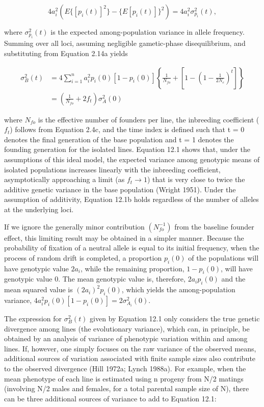 \documentclass{article}
\begin{document}
\begin{equation}
4a_{i}^{2}\left(E\{[p_{i}(t)]^{2}\}-\{E[p_{i}(t)]\}^{2}\right)=4a_{i}^{2}\sigma_{p_{i}}^{2}(t),
\end{equation}

where  $ \sigma_{p_i}^2(t) $ is the expected among-population variance in allele frequency. Summing over all loci, assuming negligible gametic-phase disequilibrium, and substituting from Equation 2.14a yields

\begin{equation}
\begin{aligned}\sigma_{B}^{2}(t)&=4\sum_{i=1}^{n}a_{i}^{2}p_{i}(0)[1-p_{i}(0)]\left\{\frac{1}{N_{f o}}+\left[1-\left(1-\frac{1}{2N_{e}}\right)^{t}\right]\right\}\\&=\left(\frac{1}{N_{f o}}+2f_{t}\right)\sigma_{A}^{2}(0)\end{aligned}
\tag{12.1a}
\label{eq:12_1a}
\end{equation}

where  $ N_{fo} $ is the effective number of founders per line, the inbreeding coefficient ( $ f_t $) follows from Equation 2.4c, and the time index is defined such that t = 0 denotes the final generation of the base population and t = 1 denotes the founding generation for the isolated lines. Equation 12.1 shows that, under the assumptions of this ideal model, the expected variance among genotypic means of isolated populations increases linearly with the inbreeding coefficient, asymptotically approaching a limit (as  $ f_t \to 1 $) that is very close to twice the additive genetic variance in the base population (Wright 1951). Under the assumption of additivity, Equation 12.1b holds regardless of the number of alleles at the underlying loci.

If we ignore the generally minor contribution  $ (N_{fo}^{-1}) $ from the baseline founder effect, this limiting result may be obtained in a simpler manner. Because the probability of fixation of a neutral allele is equal to its initial frequency, when the process of random drift is completed, a proportion  $ p_i(0) $ of the populations will have genotypic value  $ 2a_i $, while the remaining proportion,  $ 1 - p_i(0) $, will have genotypic value 0. The mean genotypic value is, therefore,  $ 2a_i p_i(0) $ and the mean squared value is  $ (2a_i)^2 p_i(0) $, which yields the among-population variance,  $ 4a_i^2 p_i(0)[1 - p_i(0)] = 2\sigma_{A_i}^2(0) $.

The expression for  $ \sigma_B^2(t) $ given by Equation 12.1 only considers the true genetic divergence among lines (the evolutionary variance), which can, in principle, be obtained by an analysis of variance of phenotypic variation within and among lines. If, however, one simply focuses on the raw variance of the observed means, additional sources of variation associated with finite sample sizes also contribute to the observed divergence (Hill 1972a; Lynch 1988a). For example, when the mean phenotype of each line is estimated using n progeny from N/2 matings (involving N/2 males and females, for a total parental sample size of N), there can be three additional sources of variance to add to Equation 12.1:
\end{document}
